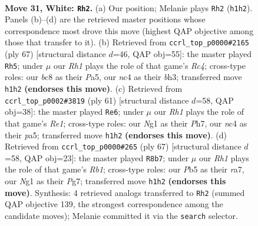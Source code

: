 \documentclass[11pt]{article}
\begin{document}
\clearpage

\begin{figure}[p]\centering
\begin{subfigure}{0.46\textwidth}\centering
\resizebox{\linewidth}{!}{%
\newchessgame
\chessboard[
  setfen={r1b1k3/8/8/1P2p1r1/p1n2p1p/3p3P/R5P1/K4NNR w q - 0 31},
  showmover=false,
  pgfstyle=straightmove, color=movearrow, markmove={h1-h2}
]}
\caption{}
\end{subfigure}\hfill
\begin{subfigure}{0.46\textwidth}\centering
\resizebox{\linewidth}{!}{%
\newchessgame
\chessboard[
  setfen={8/5n2/1p1r1kp1/p1r5/3p1P1P/P5RB/1P1R3P/1K6 b - - 3 34},
  showmover=false,
  pgfstyle=straightmove, color=movearrow, markmove={c5-h5}
]}
\caption{}
\end{subfigure}
\\[4pt]
\begin{subfigure}{0.46\textwidth}\centering
\resizebox{\linewidth}{!}{%
\newchessgame
\chessboard[
  setfen={1r2r1k1/3n3p/p5p1/P2Np3/2p3P1/6KP/1PP5/1R2R3 b - - 0 31},
  showmover=false,
  pgfstyle=straightmove, color=movearrow, markmove={e8-e6}
]}
\caption{}
\end{subfigure}\hfill
\begin{subfigure}{0.46\textwidth}\centering
\resizebox{\linewidth}{!}{%
\newchessgame
\chessboard[
  setfen={1r6/R2k1pp1/3P1n1p/5P2/1r2pP2/8/1P1R3P/1K3B2 b - - 2 34},
  showmover=false,
  pgfstyle=straightmove, color=movearrow, markmove={b8-b7}
]}
\caption{}
\end{subfigure}
\caption{\textbf{Move 31, White: \texttt{Rh2}.} (a) Our position; Melanie plays \texttt{Rh2} (\texttt{h1h2}). Panels (b)--(d) are the retrieved master positions whose correspondence most drove this move (highest QAP objective among those that transfer to it). (b) Retrieved from \texttt{ccrl\_top\_p0000\#2165} (ply 67) [structural distance $d$=46, QAP obj=55]: the master played \texttt{Rh5}; under $\mu$ our \emph{Rh1} plays the role of that game's \emph{Rc4}; cross-type roles: our \emph{b}c8 as their \emph{P}a5, our \emph{n}c4 as their \emph{b}h3; transferred move \texttt{h1h2} \textbf{(endorses this move)}. (c) Retrieved from \texttt{ccrl\_top\_p0002\#3819} (ply 61) [structural distance $d$=58, QAP obj=38]: the master played \texttt{Re6}; under $\mu$ our \emph{Rh1} plays the role of that game's \emph{Re1}; cross-type roles: our \emph{N}g1 as their \emph{P}h7, our \emph{n}c4 as their \emph{p}a5; transferred move \texttt{h1h2} \textbf{(endorses this move)}. (d) Retrieved from \texttt{ccrl\_top\_p0000\#265} (ply 67) [structural distance $d$=58, QAP obj=23]: the master played \texttt{R8b7}; under $\mu$ our \emph{Rh1} plays the role of that game's \emph{Rb1}; cross-type roles: our \emph{P}b5 as their \emph{r}a7, our \emph{N}g1 as their \emph{P}g7; transferred move \texttt{h1h2} \textbf{(endorses this move)}. Synthesis: 4 retrieved analogs transferred to \texttt{Rh2} (summed QAP objective 139, the strongest correspondence among the candidate moves); Melanie committed it via the \texttt{search} selector.}
\label{fig:thought-m60}
\end{figure}
\end{document}
